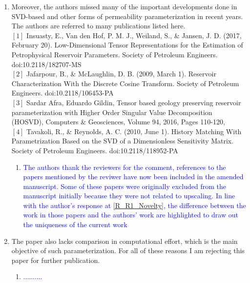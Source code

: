 \documentclass[11pt]{letter} %
\newcommand{\blue}{\textcolor{blue}}
\begin{document}
\begin{letter}
{\begin{enumerate}
\begin{enumerate}
\begin{enumerate}
        \end{enumerate}
    \item \label{R_R1_MissedNewDev}Moreover, the authors missed many of the important developments done in SVD-based and other forms of permeability  parameterization in recent years. The authors are referred to many publications listed here.\\
$[1]$ Insuasty, E., Van den Hof, P. M. J., Weiland, S., \& Jansen, J. D. (2017, February 20). Low-Dimensional Tensor Representations for the Estimation of Petrophysical Reservoir Parameters. Society of Petroleum Engineers. doi:10.2118/182707-MS\\
$[2]$ Jafarpour, B., \& McLaughlin, D. B. (2009, March 1). Reservoir Characterization With the Discrete Cosine Transform. Society of Petroleum Engineers. doi:10.2118/106453-PA\\
$[3]$ Sardar Afra, Eduardo Gildin, Tensor based geology preserving reservoir parameterization with Higher Order Singular Value Decomposition (HOSVD), Computers \& Geosciences, Volume 94, 2016, Pages 110-120,\\
      $[4]$  Tavakoli, R., \& Reynolds, A. C. (2010, June 1). History Matching With Parametrization Based on the SVD of a Dimensionless Sensitivity Matrix. Society of Petroleum Engineers. doi:10.2118/118952-PA
      \begin{enumerate}
      \item \label{R_R1_MissedNewDev_P1} \blue{The authors thank the reviewers for the comment, references to the papers mentioned by the reviwer have now been included in the amended manuscript. Some of these papers were originally excluded from the manuscript initially because they were not related to upscaling. In line with the author's response at \ref{R_R1_Novelty}, the difference between the work in those papers and the authors' work are highlighted to draw out the uniqueness of the current work}
        \end{enumerate}
    \item \label{R_R1_CompEffort} The paper also lacks comparison in computational effort, which is the main objective of such parameterization. For all of these reasons I am rejecting this paper for further publication.
      \begin{enumerate}
      \item \label{R_R1_CompEffort} \blue{..........}
        \end{enumerate}
    \end{enumerate}


\end{enumerate}}
\end{letter}
\end{document}
